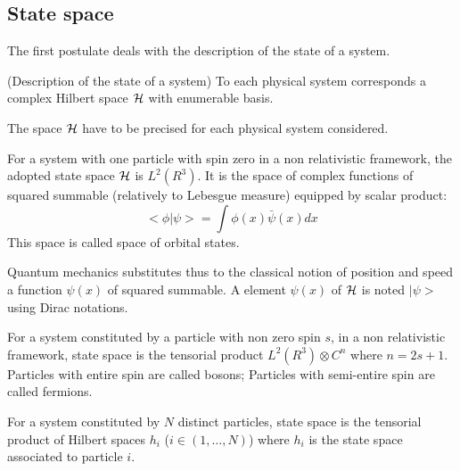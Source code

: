 \documentclass[12pt]{book}
\begin{document}
\subsection{State space}\label{secespetat}
The first postulate deals with the description of the state of a system.
\begin{postulat}
(Description of the state of a system) To each physical system corresponds a
complex 
Hilbert space
${\cal H}$ with enumerable basis.
\end{postulat}
The space ${\cal H}$ have to be precised for each physical system considered. 
\begin{exmp}
For a system with one particle with spin zero in a non relativistic
framework, the adopted state space ${\cal H}$ is $L^2(R^3)$. It is the space
of complex functions of squared summable (relatively to Lebesgue measure)
equipped by scalar product:
\begin{equation}
<\phi|\psi>=\int \phi(x)\bar\psi(x) dx
\end{equation}
This space is called space of orbital states. 
\end{exmp}
Quantum mechanics substitutes thus to the classical notion of position and
speed a function $\psi(x)$ of squared summable. A element $\psi(x)$ of $\cal
H$ is noted $|\psi>$ using Dirac notations.
\begin{exmp}
For a system constituted by a particle with non zero spin
$s$, in a non relativistic framework, state space is the tensorial
product $L^2(R^3)\otimes C^n$ where $n=2s+1$.
Particles with entire spin are called bosons; Particles with
semi-entire spin are called fermions. 
\end{exmp}
\begin{exmp}
For a system constituted by $N$ distinct particles, state space is the
tensorial product of Hilbert spaces $h_i$ ($i
\in (1,\dots,N)$)
where $h_i$ is the state space associated to particle $i$.
\end{exmp}
\end{document}
